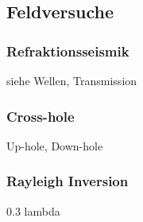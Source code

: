\subsection{Feldversuche}




\begin{frame}
\frametitle{Refraktionsseismik}
siehe Wellen, Transmission

\end{frame}


\begin{frame}
\frametitle{Cross-hole}

Up-hole, Down-hole
\end{frame}


\begin{frame}
\frametitle{Rayleigh Inversion}
0.3 lambda

\end{frame}
